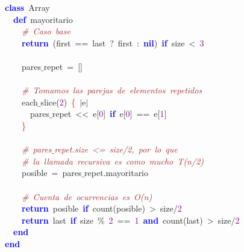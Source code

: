 \noindent
\mbox{}\textbf{\textcolor{Blue}{class}}\ Array \\
\mbox{}\ \ \textbf{\textcolor{Blue}{def}}\ mayoritario \\
\mbox{}\ \ \ \ \textit{\textcolor{Brown}{\#\ Caso\ base}} \\
\mbox{}\ \ \ \ \textbf{\textcolor{Blue}{return}}\ \textcolor{BrickRed}{(}first\ \textcolor{BrickRed}{==}\ last\ \textcolor{BrickRed}{?}\ first\ \textcolor{BrickRed}{:}\ \textbf{\textcolor{Blue}{nil}}\textcolor{BrickRed}{)}\ \textbf{\textcolor{Blue}{if}}\ size\ \textcolor{BrickRed}{\textless{}}\ \textcolor{Purple}{3} \\
\mbox{}\ \ \ \  \\
\mbox{}\ \ \ \ pares$\_$repet\ \textcolor{BrickRed}{=}\ \textcolor{BrickRed}{[]} \\
\mbox{} \\
\mbox{}\ \ \ \ \textit{\textcolor{Brown}{\#\ Tomamos\ las\ parejas\ de\ elementos\ repetidos}} \\
\mbox{}\ \ \ \ each$\_$slice\textcolor{BrickRed}{(}\textcolor{Purple}{2}\textcolor{BrickRed}{)}\ \textcolor{Red}{\{}\ \textcolor{BrickRed}{$|$}e\textcolor{BrickRed}{$|$} \\
\mbox{}\ \ \ \ \ \ pares$\_$repet\ \textcolor{BrickRed}{\textless{}\textless{}}\ e\textcolor{BrickRed}{[}\textcolor{Purple}{0}\textcolor{BrickRed}{]}\ \textbf{\textcolor{Blue}{if}}\ e\textcolor{BrickRed}{[}\textcolor{Purple}{0}\textcolor{BrickRed}{]}\ \textcolor{BrickRed}{==}\ e\textcolor{BrickRed}{[}\textcolor{Purple}{1}\textcolor{BrickRed}{]} \\
\mbox{}\ \ \ \ \textcolor{Red}{\}} \\
\mbox{} \\
\mbox{}\ \ \ \ \textit{\textcolor{Brown}{\#\ pares$\_$repet.size\ \textless{}=\ size/2,\ por\ lo\ que}} \\
\mbox{}\ \ \ \ \textit{\textcolor{Brown}{\#\ la\ llamada\ recursiva\ es\ como\ mucho\ T(n/2)}} \\
\mbox{}\ \ \ \ posible\ \textcolor{BrickRed}{=}\ pares$\_$repet\textcolor{BrickRed}{.}mayoritario \\
\mbox{} \\
\mbox{}\ \ \ \ \textit{\textcolor{Brown}{\#\ Cuenta\ de\ ocurrencias\ es\ O(n)}} \\
\mbox{}\ \ \ \ \textbf{\textcolor{Blue}{return}}\ posible\ \textbf{\textcolor{Blue}{if}}\ count\textcolor{BrickRed}{(}posible\textcolor{BrickRed}{)}\ \textcolor{BrickRed}{\textgreater{}}\ size\textcolor{BrickRed}{/}\textcolor{Purple}{2} \\
\mbox{}\ \ \ \ \textbf{\textcolor{Blue}{return}}\ last\ \textbf{\textcolor{Blue}{if}}\ size\ \textcolor{BrickRed}{\%}\ \textcolor{Purple}{2}\ \textcolor{BrickRed}{==}\ \textcolor{Purple}{1}\ \textbf{\textcolor{Blue}{and}}\ count\textcolor{BrickRed}{(}last\textcolor{BrickRed}{)}\ \textcolor{BrickRed}{\textgreater{}}\ size\textcolor{BrickRed}{/}\textcolor{Purple}{2} \\
\mbox{}\ \ \textbf{\textcolor{Blue}{end}} \\
\mbox{}\textbf{\textcolor{Blue}{end}} \\
\mbox{}
